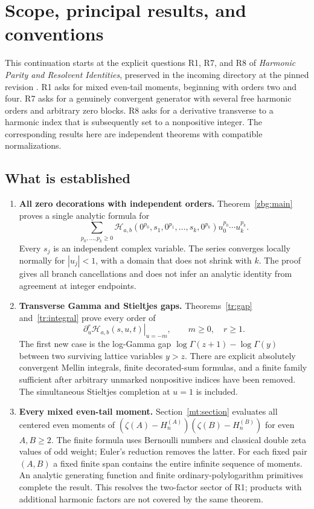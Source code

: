 \documentclass[11pt,letterpaper]{article}
\numberwithin{equation}{section}
\theoremstyle{plain}
\theoremstyle{definition}
\theoremstyle{remark}
\newcommand{\HH}{\mathcal H}
\begin{document}
\section{Scope, principal results, and conventions}
\label{scope:section}

This continuation starts at the explicit questions R1, R7, and R8 of
\emph{Harmonic Parity and Resolvent Identities}, preserved in the incoming
directory at the pinned revision \cite{IncomingParity,Repository}.
R1 asks for mixed even-tail moments, beginning with orders two and four.
R7 asks for a genuinely convergent generator with several free harmonic
orders and arbitrary zero blocks. R8 asks for a derivative transverse to
a harmonic index that is subsequently set to a nonpositive integer.
The corresponding results here are independent theorems with compatible
normalizations.

\subsection{What is established}

\begin{enumerate}[leftmargin=*,label=\textbf{\arabic*.}]
\item \textbf{All zero decorations with independent orders.}
Theorem~\ref{zbg:main} proves a single analytic formula for
\[
 \sum_{p_0,\ldots,p_k\geq0}
 \HH_{a,b}(0^{p_0},s_1,0^{p_1},\ldots,s_k,0^{p_k})
                     u_0^{p_0}\cdots u_k^{p_k}.
\]
Every $s_j$ is an independent complex variable. The series converges
locally normally for $|u_j|<1$, with a domain that does not shrink with
$k$. The proof gives all branch cancellations and does not infer an
analytic identity from agreement at integer endpoints.

\item \textbf{Transverse Gamma and Stieltjes gaps.}
Theorems~\ref{tr:gap} and~\ref{tr:integral} prove every order of
\[
 \left.\partial_u^r\HH_{a,b}(s,u,t)\right|_{u=-m},
 \qquad m\geq0,\quad r\geq1.
\]
The first new case is the log-Gamma gap
$\log\Gamma(z+1)-\log\Gamma(y)$ between two surviving lattice variables
$y>z$. There are explicit absolutely convergent Mellin integrals, finite
decorated-sum formulas, and a finite family sufficient after arbitrary
unmarked nonpositive indices have been removed. The simultaneous
Stieltjes completion at $u=1$ is included.

\item \textbf{Every mixed even-tail moment.}
Section~\ref{mt:section} evaluates all centered even moments of
$(\zeta(A)-H_n^{(A)})(\zeta(B)-H_n^{(B)})$ for even $A,B\geq2$.
The finite formula uses Bernoulli numbers and classical double zeta
values of odd weight; Euler's reduction removes the latter.
For each fixed pair $(A,B)$ a fixed finite span contains the entire
infinite sequence of moments. An analytic generating function and
finite ordinary-polylogarithm primitives complete the result.
This resolves the two-factor sector of R1; products with additional
harmonic factors are not covered by the same theorem.
\end{enumerate}
\end{document}
